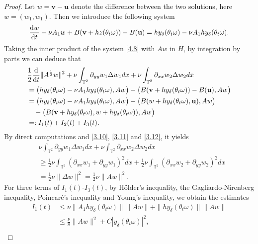 \documentclass{elsarticle}
\theoremstyle{definition}
\numberwithin{equation}{section}
\renewcommand{\d}{{\rm{d}}}
\begin{document}
\begin{proof}
Let  $w=\textbf{v}-\textbf{u}$ denote the difference between the two solutions, here $w=(w_1,w_1)$. Then we introduce the following system
\begin{align}\label{4.8}
\frac{\d w}{\d t}+ \nu  A_1w+B( \textbf{v}+hz(\theta_t\omega))-B(\textbf{u}) = hy_\delta(\theta_t\omega) - \nu A_1hy_\delta(\theta_t\omega).
\end{align}
Taking the inner product of the system   \eqref{4.8} with $Aw$ in $H$,  by integration by parts we can deduce that
\begin{align}\label{4.11}
 &\frac12\frac{\d}{\d t}\|A^{\frac12}w\|^2+ \nu \int_{\mathbb{T}^2}\partial_{yy}w_1\Delta w_1dx+\nu \int_{\mathbb{T}^2}\partial_{xx}w_2\Delta w_2dx \nonumber \\
&= \big (hy_\delta(\theta_t\omega)-\nu A_1hy_\delta(\theta_t\omega) ,Aw \big )  - \big(B(\textbf{v}+hy_\delta(\theta_t\omega))-B(\textbf{u}),Aw\big) \nonumber \\
&= \big  (hy_\delta(\theta_t\omega)-\nu A_1hy_\delta(\theta_t\omega) ,Aw \big ) - \big (B(w+hy_\delta(\theta_t\omega),\textbf{u}),Aw \big ) \nonumber\\
&\quad -  \big (B(\textbf{v}+hy_\delta(\theta_t\omega),w+hy_\delta(\theta_t\omega)),Aw  \big ) \nonumber \\
&=: I_{1}(t) + I_{2}(t)+I_{3}(t) .
\end{align}
By direct computations and \eqref{3.10}, \eqref{3.11} and \eqref{3.12}, it yields
\begin{align}\label{4.1}
&\nu \int_{\mathbb{T}^2}\partial_{yy}w_1\Delta w_1dx+\nu \int_{\mathbb{T}^2}\partial_{xx}w_2\Delta w_2dx\nonumber\\
&\geq \frac12\nu \int_{\mathbb{T}^2}(\partial_{xx}w_1+\partial_{yy}w_1)^2dx
+\frac12\nu \int_{\mathbb{T}^2}(\partial_{xx}w_2+\partial_{yy}w_2)^2dx
\nonumber\\
&=\frac12\nu\|\Delta w\|^2=\frac12\nu\|A w\|^2.
\end{align}
For three terms of $I_{1}(t)$-$I_{3}(t)$, by H\"{o}lder's inequality, the Gagliardo-Nirenberg inequality,  Poincar\'{e}'s inequality and Young's inequality, we obtain the estimates
\begin{align}\label{4.10}
 I_{1}(t)   &\leq \nu\|A_1hy_\delta(\theta_t\omega)\|\|Aw\|+\|hy_\delta(\theta_t\omega)\|\|Aw\|\nonumber\\
&\leq \frac  \nu 8\|Aw\|^2+C|y_\delta(\theta_t\omega)|^2,
\end{align}
\begin{align}

\end{align}
\end{proof}
\end{document}
